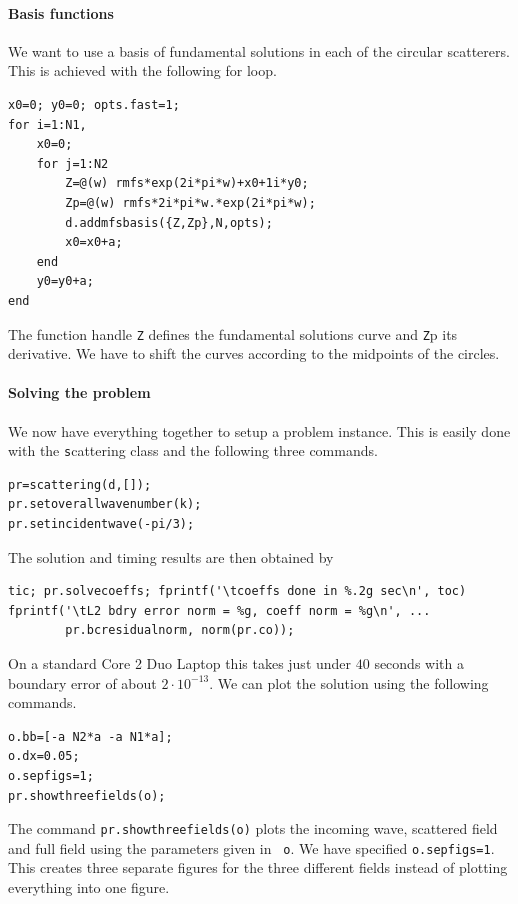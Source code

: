 \paragraph{Basis functions}

We want to use a basis of fundamental solutions in each of the
circular scatterers. This is achieved with the following for loop.
\begin{verbatim}
x0=0; y0=0; opts.fast=1;
for i=1:N1,
    x0=0;
    for j=1:N2
        Z=@(w) rmfs*exp(2i*pi*w)+x0+1i*y0;
        Zp=@(w) rmfs*2i*pi*w.*exp(2i*pi*w);
        d.addmfsbasis({Z,Zp},N,opts);
        x0=x0+a;
    end
    y0=y0+a;
end
\end{verbatim}
The function handle {\texttt Z} defines the fundamental solutions
curve and {\texttt Zp} its derivative. We have to shift the curves
according to the midpoints of the circles.

\paragraph{Solving the problem}
We now have everything together to setup a problem instance.
This is easily done with the {\texttt
  scattering} class and the following three commands.

\begin{verbatim}
pr=scattering(d,[]);
pr.setoverallwavenumber(k);
pr.setincidentwave(-pi/3);
\end{verbatim}

The solution and timing results are then obtained by
\begin{verbatim}
tic; pr.solvecoeffs; fprintf('\tcoeffs done in %.2g sec\n', toc)
fprintf('\tL2 bdry error norm = %g, coeff norm = %g\n', ...
        pr.bcresidualnorm, norm(pr.co));
\end{verbatim}
On a standard Core 2 Duo Laptop this takes just under $40$
seconds with a boundary error of about $2\cdot 10^{-13}$.
We can plot the solution using the following commands.
\begin{verbatim}
o.bb=[-a N2*a -a N1*a];
o.dx=0.05;
o.sepfigs=1;
pr.showthreefields(o);
\end{verbatim}
The command {\tt pr.showthreefields(o)} plots the incoming wave,
scattered field and full field using the parameters given in {\tt
  o}. We have specified {\tt o.sepfigs=1}. This creates three
separate figures for the three different fields instead of plotting
everything into one figure.

